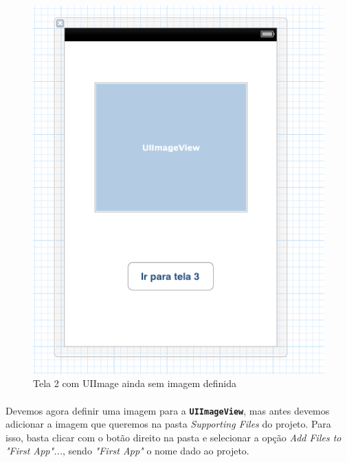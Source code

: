 \documentclass[a4paper,12pt,brazil,doubleside]{book}
\begin{document}
\begin{singlespace}
\bigskip
\bigskip

\begin{figure}[H]
  \centering
  \includegraphics[totalheight=0.5\textheight]{figuras/2/xib_tela2.png}
  \caption{Tela 2 com UIImage ainda sem imagem definida}
  \label{fig:a}
\end{figure}

\bigskip

\paragraph{}Devemos agora definir uma imagem para a \texttt{\textbf{UIImageView}}, mas antes devemos adicionar a imagem que queremos na pasta \emph{Supporting Files} do projeto. Para isso, basta clicar com o botão direito na pasta e selecionar a opção \emph{Add Files to "First App"...}, sendo \emph{"First App"} o nome dado ao projeto.

\bigskip
\bigskip


\end{singlespace}
\end{document}
